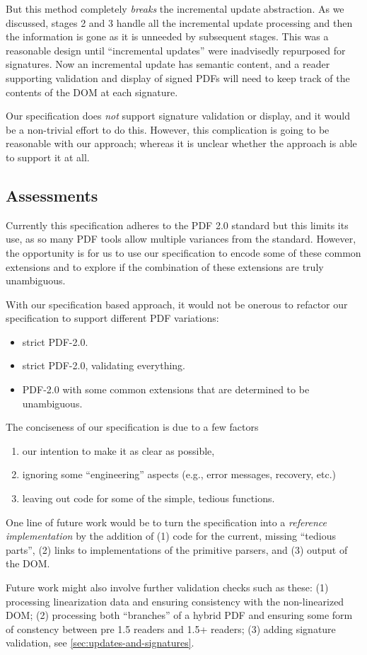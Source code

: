 But this method completely \emph{breaks} the incremental update
abstraction.  As we discussed, stages 2 and 3 handle all
the incremental update processing and then the information is gone as
it is unneeded by subsequent stages.
% 
This was a reasonable design until ``incremental updates'' were
inadvisedly repurposed for signatures.  Now an incremental update has
semantic content, and a reader supporting validation and display of
signed PDFs will need to keep track of the contents of the DOM at each
signature.

Our specification does \emph{not} support signature validation or
display, and it would be a non-trivial effort to do this.  However,
this complication is going to be reasonable with our \ssp{} approach;
whereas it is unclear whether the \dsp{} approach is able to support
it at all.

\subsection{Assessments}

Currently this specification adheres to the PDF 2.0 standard but this
limits its use, as so many PDF tools allow multiple variances from the
standard.
%
However, the opportunity is for us to use our specification to encode
some of these common extensions and to explore if the combination of
these extensions are truly unambiguous.

With our specification based approach, it would not be onerous
to refactor our specification to support different PDF variations:
\begin{itemize}
\item strict PDF-2.0.
\item strict PDF-2.0, validating everything.
\item PDF-2.0 with some common extensions that are determined to be unambiguous.
\end{itemize}

The conciseness of our specification is due to a few factors
\begin{enumerate}
\item our intention to make it as clear as possible,
\item ignoring some ``engineering'' aspects (e.g., error
   messages, recovery, etc.)
\item leaving out code for some of the simple, tedious functions.
\end{enumerate}
One line of future work would be to turn the specification into a
\emph{reference implementation} by the addition of
(1) code for the current, missing ``tedious parts'',
(2) links to implementations of the primitive parsers, and
(3) output of the DOM.

Future work might also involve further validation checks such as these:
(1) processing linearization data and ensuring consistency with the
non-linearized DOM;
(2) processing both ``branches'' of a hybrid PDF and ensuring
some form of constency between pre 1.5 readers and 1.5+ readers;
(3) adding signature validation, see \cref{sec:updates-and-signatures}.
